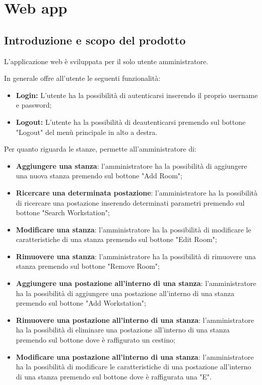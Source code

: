 \section{Web app}

\subsection{Introduzione e scopo del prodotto}
L'applicazione web è sviluppata per il solo utente amministratore.

In generale offre all'utente le seguenti funzionalità:
\begin{itemize}
	\item \textbf{Login:} L'utente ha la possibilità di autenticarsi inserendo il proprio username e password; \\
	\item \textbf{Logout:} L'utente ha la possibilità di deautenticarsi premendo sul bottone "Logout" del menù principale in alto a destra. \\
\end{itemize}
Per quanto riguarda le stanze, permette all'amministratore di:
\begin{itemize}
	\item \textbf{Aggiungere una stanza}: l'amministratore ha la possibilità di aggiungere una nuova stanza premendo sul bottone "Add Room"; \\
	\item \textbf{Ricercare una determinata postazione}: l'amministratore ha la possibilità di ricercare una postazione inserendo determinati parametri premendo sul bottone "Search Workstation"; \\
	\item \textbf{Modificare una stanza}: l'amministratore ha la possibilità di modificare le caratteristiche di una stanza premendo sul bottone "Edit Room"; \\
	\item \textbf{Rimuovere una stanza}: l'amministratore ha la possibilità di rimuovere una stanza premendo sul bottone "Remove Room"; \\
	\item \textbf{Aggiungere una postazione all'interno di una stanza}: l'amministratore ha la possibilità di aggiungere una postazione all'interno di una stanza premendo sul bottone "Add Workstation"; \\
	\item \textbf{Rimuovere una postazione all'interno di una stanza}: l'amministratore ha la possibilità di eliminare una postazione all'interno di una stanza premendo sul bottone dove è raffigurato un cestino; \\
	\item \textbf{Modificare una postazione all'interno di una stanza}:  l'amministratore ha la possibilità di modificare le caratteristiche di una postazione all'interno di una stanza premendo sul bottone dove è raffigurata una "E". \\
\end{itemize}
